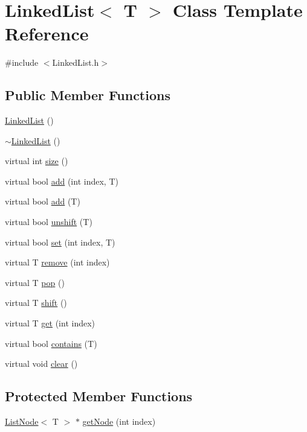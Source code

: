 \hypertarget{classLinkedList}{\section{Linked\-List$<$ T $>$ Class Template Reference}
\label{classLinkedList}
}


{\ttfamily \#include $<$Linked\-List.\-h$>$}

\subsection*{Public Member Functions}
\begin{DoxyCompactItemize}
\item 
\hyperlink{classLinkedList_a3c20fcfec867e867f541061a09fc640c}{Linked\-List} ()
\item 
\hyperlink{classLinkedList_a7c37609df3b83bc4eb0281b852f93fd7}{$\sim$\-Linked\-List} ()
\item 
virtual int \hyperlink{classLinkedList_ab8388ea027c2de8125f5d1e5901c2b2e}{size} ()
\item 
virtual bool \hyperlink{classLinkedList_a3307f9b9ecf90a18c270b3b6bc7a7e04}{add} (int index, T)
\item 
virtual bool \hyperlink{classLinkedList_a9c3c4f3f527bde2e1572a43f3fb26ea3}{add} (T)
\item 
virtual bool \hyperlink{classLinkedList_a55ba7f61737011f2b684d59154543e6e}{unshift} (T)
\item 
virtual bool \hyperlink{classLinkedList_a08ce5b6527cefbd221324569fdb10969}{set} (int index, T)
\item 
virtual T \hyperlink{classLinkedList_af331637727b3ada2f806c29b9f4cc6fe}{remove} (int index)
\item 
virtual T \hyperlink{classLinkedList_a00a70f924d76dcbfa3b05503caad40e6}{pop} ()
\item 
virtual T \hyperlink{classLinkedList_aaf7239844a9d745b6dd11249ff4990c8}{shift} ()
\item 
virtual T \hyperlink{classLinkedList_a25079ed9b408efad63a1522c818d8705}{get} (int index)
\item 
virtual bool \hyperlink{classLinkedList_af1de9b03ff401cae0a842680b77d32c2}{contains} (T)
\item 
virtual void \hyperlink{classLinkedList_a50c26292740c964ac7bef0e072868be1}{clear} ()
\end{DoxyCompactItemize}
\subsection*{Protected Member Functions}
\begin{DoxyCompactItemize}
\item 
\hyperlink{structListNode}{List\-Node}$<$ T $>$ $\ast$ \hyperlink{classLinkedList_a8ac5df15e0aba36cb279bf2ce0d6b72e}{get\-Node} (int index)
\end{DoxyCompactItemize}
